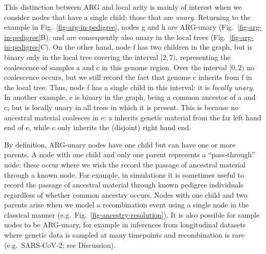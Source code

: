 \documentclass{article}
\newcommand{\noderef}[1]{\textsf{#1}}
\begin{document}
This distinction between ARG and local arity is mainly
of interest when we consider nodes that have
a single child: those that are \emph{unary}.
Returning to the example in Fig.~\ref{fig-arg-in-pedigree}, nodes
\noderef{g} and \noderef{h}
are ARG-unary (Fig.~\ref{fig-arg-in-pedigree}B), and are consequently
also unary in the local trees (Fig.~\ref{fig-arg-in-pedigree}C).
On the other hand, node \noderef{f} has two children
in the graph, but is binary only
in the local tree covering the interval $[2, 7)$,
representing the coalescence of samples \noderef{a} and \noderef{c}
in this genome region. Over the interval $[0, 2)$ no coalescence occurs,
but we still record the fact that genome \noderef{c} inherits from \noderef{f}
in the local tree. Thus, node \noderef{f} has a single child in this
interval: it is \emph{locally unary}.
In another example, \noderef{e} is binary in the graph, being a common
ancestor of \noderef{a} and \noderef{c}, but is
locally unary in all trees in which it is present.
This is because no ancestral material coalesces in \noderef{e}:
\noderef{a} inherits genetic material from the far left hand end of
\noderef{e},
while \noderef{c} only inherits the (disjoint) right hand end.

By definition, ARG-unary nodes have one child but can have one or
more parents.
A node with one child and only one parent represents a ``pass-through'' node:
these occur where we wish the record the passage of ancestral material
through a known node. For example, in simulations
it is sometimes useful to record the passage of
ancestral material through known pedigree individuals
regardless of whether common ancestry occurs.
Nodes with one child and two parents arise when
we model a recombination event using a single node
in the classical manner
(e.g.\ Fig.~\ref{fig-ancestry-resolution}).
It is also possible for sample nodes to be ARG-unary, for example
in inferences from longitudinal datasets where genetic
data is sampled at many timepoints and recombination
is rare (e.g.~SARS-CoV-2; see Discussion).
\end{document}
